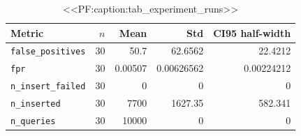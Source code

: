 
\begin{table}[htbp]
  \centering
  \caption{<<PF:caption:tab_experiment_runs>>}
  \label{tab:experiment_runs}
  \begin{tabular}{lrrrr}
    \toprule
    Metric & $n$ & Mean & Std & CI95 half-width \\
    \midrule
    \texttt{false\_positives} & 30 & 50.7 & 62.6562 & 22.4212 \\
    \texttt{fpr} & 30 & 0.00507 & 0.00626562 & 0.00224212 \\
    \texttt{n\_insert\_failed} & 30 & 0 & 0 & 0 \\
    \texttt{n\_inserted} & 30 & 7700 & 1627.35 & 582.341 \\
    \texttt{n\_queries} & 30 & 10000 & 0 & 0 \\
    \bottomrule
  \end{tabular}
\end{table}
